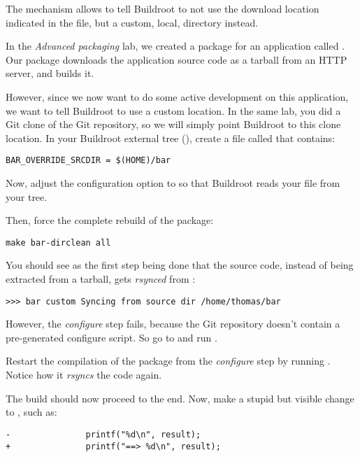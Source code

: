 The  mechanism allows to tell Buildroot to
not use the download location indicated in the  file, but a
custom, local, directory instead.

In the {\em Advanced packaging} lab, we created a package for an
application called . Our  package downloads the
application source code as a tarball from an HTTP server, and builds
it.

However, since we now want to do some active development on this
application, we want to tell Buildroot to use a custom location. In
the same lab, you did a Git clone of the  Git repository, so
we will simply point Buildroot to this clone location. In your
Buildroot external tree (), create a file called
 that contains:

\begin{verbatim}
BAR_OVERRIDE_SRCDIR = $(HOME)/bar
\end{verbatim}

Now, adjust the  configuration option
to  so that Buildroot reads your
 file from your  tree.

Then, force the complete rebuild of the  package:

\begin{verbatim}
make bar-dirclean all
\end{verbatim}

You should see as the first step being done that the  source
code, instead of being extracted from a tarball, gets {\em rsynced}
from :

\begin{verbatim}
>>> bar custom Syncing from source dir /home/thomas/bar
\end{verbatim}

However, the {\em configure} step fails, because the Git repository
doesn't contain a pre-generated configure script. So go to
 and run .

Restart the compilation of the  package from the {\em
  configure} step by running . Notice how
it {\em rsyncs} the code again.

The build should now proceed to the end. Now, make a stupid but
visible change to , such as:

\begin{verbatim}
-               printf("%d\n", result);
+               printf("==> %d\n", result);
\end{verbatim}

